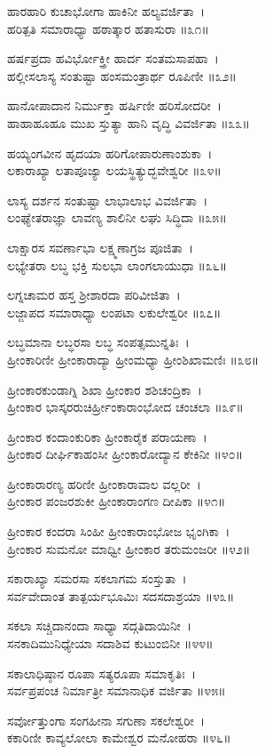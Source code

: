 {ಹಾರಹಾರಿ ಕುಚಾಭೋಗಾ ಹಾಕಿನೀ ಹಲ್ಯವರ್ಜಿತಾ~।\\
ಹರಿತ್ಪತಿ ಸಮಾರಾಧ್ಯಾ ಹಠಾತ್ಕಾರ ಹತಾಸುರಾ ॥೩೧॥

ಹರ್ಷಪ್ರದಾ ಹವಿರ್ಭೋಕ್ತ್ರೀ ಹಾರ್ದ ಸಂತಮಸಾಪಹಾ~।\\
ಹಲ್ಲೀಸಲಾಸ್ಯ ಸಂತುಷ್ಟಾ ಹಂಸಮಂತ್ರಾರ್ಥ ರೂಪಿಣೀ ॥೩೨॥

ಹಾನೋಪಾದಾನ ನಿರ್ಮುಕ್ತಾ ಹರ್ಷಿಣೀ ಹರಿಸೋದರೀ~।\\
ಹಾಹಾಹೂಹೂ ಮುಖ ಸ್ತುತ್ಯಾ ಹಾನಿ ವೃದ್ಧಿ ವಿವರ್ಜಿತಾ ॥೩೩॥

ಹಯ್ಯಂಗವೀನ ಹೃದಯಾ ಹರಿಗೋಪಾರುಣಾಂಶುಕಾ~।\\
ಲಕಾರಾಖ್ಯಾ ಲತಾಪೂಜ್ಯಾ ಲಯಸ್ಥಿತ್ಯುದ್ಭವೇಶ್ವರೀ ॥೩೪॥

ಲಾಸ್ಯ ದರ್ಶನ ಸಂತುಷ್ಟಾ ಲಾಭಾಲಾಭ ವಿವರ್ಜಿತಾ~।\\
ಲಂಘ್ಯೇತರಾಜ್ಞಾ ಲಾವಣ್ಯ ಶಾಲಿನೀ ಲಘು ಸಿದ್ಧಿದಾ ॥೩೫॥

ಲಾಕ್ಷಾರಸ ಸವರ್ಣಾಭಾ ಲಕ್ಷ್ಮಣಾಗ್ರಜ ಪೂಜಿತಾ~।\\
ಲಭ್ಯೇತರಾ ಲಬ್ಧ ಭಕ್ತಿ ಸುಲಭಾ ಲಾಂಗಲಾಯುಧಾ ॥೩೬॥

ಲಗ್ನಚಾಮರ ಹಸ್ತ ಶ್ರೀಶಾರದಾ ಪರಿವೀಜಿತಾ~।\\
ಲಜ್ಜಾಪದ ಸಮಾರಾಧ್ಯಾ ಲಂಪಟಾ ಲಕುಲೇಶ್ವರೀ ॥೩೭॥

ಲಬ್ಧಮಾನಾ ಲಬ್ಧರಸಾ ಲಬ್ಧ ಸಂಪತ್ಸಮುನ್ನತಿಃ~।\\
ಹ್ರೀಂಕಾರಿಣೀ ಹ್ರೀಂಕಾರಾದ್ಯಾ ಹ್ರೀಂಮಧ್ಯಾ ಹ್ರೀಂಶಿಖಾಮಣಿಃ ॥೩೮॥

ಹ್ರೀಂಕಾರಕುಂಡಾಗ್ನಿ ಶಿಖಾ ಹ್ರೀಂಕಾರ ಶಶಿಚಂದ್ರಿಕಾ~।\\
ಹ್ರೀಂಕಾರ ಭಾಸ್ಕರರುಚಿರ್ಹ್ರೀಂಕಾರಾಂಭೋದ ಚಂಚಲಾ ॥೩೯॥

ಹ್ರೀಂಕಾರ ಕಂದಾಂಕುರಿಕಾ ಹ್ರೀಂಕಾರೈಕ ಪರಾಯಣಾ~।\\
ಹ್ರೀಂಕಾರ ದೀರ್ಘಿಕಾಹಂಸೀ ಹ್ರೀಂಕಾರೋದ್ಯಾನ ಕೇಕಿನೀ ॥೪೦॥

ಹ್ರೀಂಕಾರಾರಣ್ಯ ಹರಿಣೀ ಹ್ರೀಂಕಾರಾವಾಲ ವಲ್ಲರೀ~।\\
ಹ್ರೀಂಕಾರ ಪಂಜರಶುಕೀ ಹ್ರೀಂಕಾರಾಂಗಣ ದೀಪಿಕಾ ॥೪೧॥

ಹ್ರೀಂಕಾರ ಕಂದರಾ ಸಿಂಹೀ ಹ್ರೀಂಕಾರಾಂಭೋಜ ಭೃಂಗಿಕಾ~।\\
ಹ್ರೀಂಕಾರ ಸುಮನೋ ಮಾಧ್ವೀ ಹ್ರೀಂಕಾರ ತರುಮಂಜರೀ ॥೪೨॥

ಸಕಾರಾಖ್ಯಾ ಸಮರಸಾ ಸಕಲಾಗಮ ಸಂಸ್ತುತಾ~।\\
ಸರ್ವವೇದಾಂತ ತಾತ್ಪರ್ಯಭೂಮಿಃ ಸದಸದಾಶ್ರಯಾ ॥೪೩॥

ಸಕಲಾ ಸಚ್ಚಿದಾನಂದಾ ಸಾಧ್ಯಾ ಸದ್ಗತಿದಾಯಿನೀ~।\\
ಸನಕಾದಿಮುನಿಧ್ಯೇಯಾ ಸದಾಶಿವ ಕುಟುಂಬಿನೀ ॥೪೪॥

ಸಕಾಲಾಧಿಷ್ಠಾನ ರೂಪಾ ಸತ್ಯರೂಪಾ ಸಮಾಕೃತಿಃ~।\\
ಸರ್ವಪ್ರಪಂಚ ನಿರ್ಮಾತ್ರೀ ಸಮಾನಾಧಿಕ ವರ್ಜಿತಾ ॥೪೫॥

ಸರ್ವೋತ್ತುಂಗಾ ಸಂಗಹೀನಾ ಸಗುಣಾ ಸಕಲೇಶ್ವರೀ~।\\
ಕಕಾರಿಣೀ ಕಾವ್ಯಲೋಲಾ ಕಾಮೇಶ್ವರ ಮನೋಹರಾ ॥೪೬॥

}
